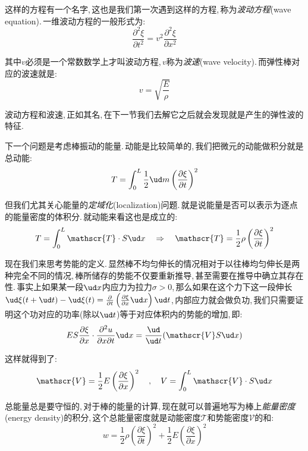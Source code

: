 这样的方程有一个名字,\,这也是我们第一次遇到这样的方程,\,称为\emph{波动方程}(wave equation).\,一维波动方程的一般形式为:
\[\frac{\partial^2 \xi}{\partial t^2}=v^2 \frac{\partial^2 \xi}{\partial x^2}\]

其中$v$必须是一个常数数学上才叫波动方程,\,$v$称为\emph{波速}(wave velocity).\,而弹性棒对应的波速就是:
\[v=\sqrt{\frac{E}{\rho}}\]

波动方程和波速,\,正如其名,\,在下一节我们去解它之后就会发现就是产生的弹性波的特征.

下一个问题是考虑棒振动的能量.\,动能是比较简单的,\,我们把微元的动能做积分就是总动能:
\[T=\int_0^L \frac{1}{2}\ud m \left(\frac{\partial \xi}{\partial t}\right)^2\]

但我们尤其关心能量的\emph{定域化}(localization)问题.\,就是说能量是否可以表示为逐点的能量密度的体积分.\,就动能来看这也是成立的:
\[T=\int_0^L\mathscr{T}\cdot S\ud x\quad\Rightarrow \quad \mathscr{T}=\frac{1}{2}\rho\left(\frac{\partial \xi}{\partial t}\right)^2\]

现在我们来思考势能的定义.\,显然棒不均匀伸长的情况相对于以往棒均匀伸长是两种完全不同的情况,\,棒所储存的势能不仅要重新推导,\,甚至需要在推导中确立其存在性.\,事实上如果某一段$\ud x$内应力为拉力$\sigma>0$,\,那么如果在这个力下这一段伸长$\ud \xi(t+\ud t)-\ud \xi(t)=\frac{\partial }{\partial t}\left(\frac{\partial \xi}{\partial x}\ud x\right)\ud t$,\,内部应力就会做负功,\,我们只需要证明这个功对应的功率(除以$\ud t$)等于对应体积内的势能的增加,\,即:
\[ES\frac{\partial \xi}{\partial x}\cdot \frac{\partial^2 u}{\partial x\partial t}\ud x=\frac{\ud}{\ud t} (\mathscr{V}S\ud x)\]

这样就得到了:
\[\mathscr{V}=\frac{1}{2}E\left(\frac{\partial \xi}{\partial x}\right)^2\quad ,\quad V=\int_0^L\mathscr{V}\cdot S\ud x\]

总能量总是要守恒的,\,对于棒的能量的计算,\,现在就可以普遍地写为棒上\emph{能量密度}(energy density)的积分,\,这个总能量密度就是动能密度$\mathscr{T}$和势能密度$\mathscr{V}$的和:
\[w=\frac{1}{2}\rho\left(\frac{\partial \xi}{\partial t}\right)^2+\frac{1}{2}E\left(\frac{\partial \xi}{\partial x}\right)^2\]

